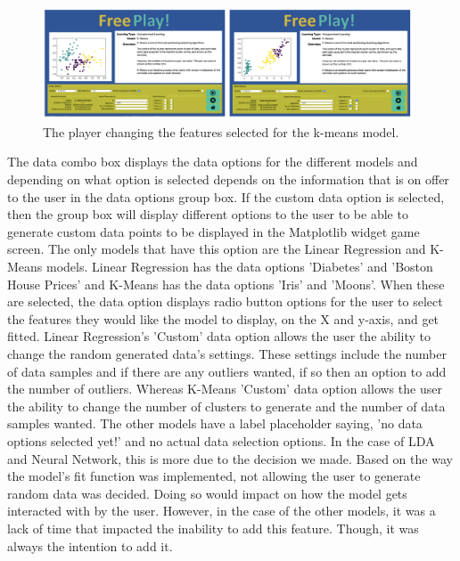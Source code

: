 		\begin{figure}[t]
			\begin{center}
				\includegraphics[width=11cm]{graphics/km_change_xy.png}
				\caption{The player changing the features selected for the k-means model.}
				\label{fig:km_change_xy}
			\end{center}
		\end{figure}
		
	
		The data combo box displays the data options for the different models and depending on what option is selected depends on the information that is on offer to the user in the data options group box. If the custom data option is selected, then the group box will display different options to the user to be able to generate custom data points to be displayed in the Matplotlib widget game screen. The only models that have this option are the Linear Regression and K-Means models. Linear Regression has the data options 'Diabetes' and 'Boston House Prices' and K-Means has the data options 'Iris' and 'Moons'. When these are selected, the data option displays radio button options for the user to select the features they would like the model to display, on the X and y-axis, and get fitted. Linear Regression's 'Custom' data option allows the user the ability to change the random generated data's settings. These settings include the number of data samples and if there are any outliers wanted, if so then an option to add the number of outliers. Whereas K-Means 'Custom' data option allows the user the ability to change the number of clusters to generate and the number of data samples wanted. The other models have a label placeholder saying, 'no data options selected yet!' and no actual data selection options. In the case of LDA and Neural Network, this is more due to the decision we made. Based on the way the model's fit function was implemented, not allowing the user to generate random data was decided. Doing so would impact on how the model gets interacted with by the user. However, in the case of the other models, it was a lack of time that impacted the inability to add this feature. Though, it was always the intention to add it.
		

